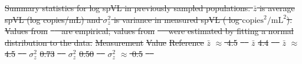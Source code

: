 \documentclass[12pt]{article} %
\providecommand{\DIFdel}[1]{{\protect\color{red}\sout{#1}}}                      %
\providecommand{\DIFdelbegin}{} %
\providecommand{\DIFdelFL}[1]{\DIFdel{#1}} %
\newcommand{\DIFscaledelfig}{0.5}
\newlength{\DIFdelgraphicswidth} %
\newlength{\DIFdelgraphicsheight} %
\newcommand{\DIFdelincludegraphics}[2][]{%
\sbox{\DIFdelgraphicsbox}{\DIFOincludegraphics[#1]{#2}}%
\settoboxwidth{\DIFdelgraphicswidth}{\DIFdelgraphicsbox} %
\settoboxtotalheight{\DIFdelgraphicsheight}{\DIFdelgraphicsbox} %
\scalebox{\DIFscaledelfig}{%
\parbox[b]{\DIFdelgraphicswidth}{\usebox{\DIFdelgraphicsbox}\\[-\baselineskip] \rule{\DIFdelgraphicswidth}{0em}}\llap{\resizebox{\DIFdelgraphicswidth}{\DIFdelgraphicsheight}{%
\setlength{\unitlength}{\DIFdelgraphicswidth}%
\begin{picture}(1,1)%
\thicklines\linethickness{2pt} %
{\color[rgb]{1,0,0}\put(0,0){\framebox(1,1){}}}%
{\color[rgb]{1,0,0}\put(0,0){\line( 1,1){1}}}%
{\color[rgb]{1,0,0}\put(0,1){\line(1,-1){1}}}%
\end{picture}%
}\hspace*{3pt}}} %
} %
\DeclareRobustCommand{\DIFdelbegin}{\DIFOdelbegin \let\includegraphics\DIFdelincludegraphics} %
\begin{document}
\DIFdelbegin %
{%
\DIFdelFL{Summary statistics for log spVL in previously sampled populations. $\bar{z}$ is average spVL (log copies/mL) and $\sigma^2_z$ is variance in measured spVL ( log $\textrm{copies}^2/\textrm{mL}^2$). Values from }%
\DIFdelFL{\mbox{%
\citep{Blanquart2017, Mitov2018} }\hskip0pt%
are empirical; values from }%
\DIFdelFL{\mbox{%
\citep{Bonhoeffer2015} }\hskip0pt%
were estimated by fitting a normal distribution to the data.}}
\DIFdelFL{Measurement }%
\DIFdelFL{Value }%
\DIFdelFL{Reference }%
\DIFdelFL{$\bar{z}$ }%
\DIFdelFL{$\approx$ 4.5 }%
\DIFdelFL{\mbox{%
\citet{Mitov2018} }\hskip0pt%
}%
\DIFdelFL{$\bar{z}$ }%
\DIFdelFL{4.4 }%
\DIFdelFL{\mbox{%
\citet{Blanquart2017} }\hskip0pt%
}%
\DIFdelFL{$\bar{z}$ }%
\DIFdelFL{$\approx$ 4.5 }%
\DIFdelFL{\mbox{%
\citet{Bonhoeffer2015} }\hskip0pt%
}%
\DIFdelFL{$\sigma^2_z$ }%
\DIFdelFL{0.73 }%
\DIFdelFL{\mbox{%
\citet{Mitov2018} }\hskip0pt%
}%
\DIFdelFL{$\sigma^2_z$ }%
\DIFdelFL{0.50 }%
\DIFdelFL{\mbox{%
\citet{Blanquart2017} }\hskip0pt%
}%
\DIFdelFL{$\sigma^2_z$ }%
\DIFdelFL{$\approx$ 0.5 }%
\DIFdelFL{\mbox{%
\citet{Bonhoeffer2015} }\hskip0pt%
}%
\end{document}
